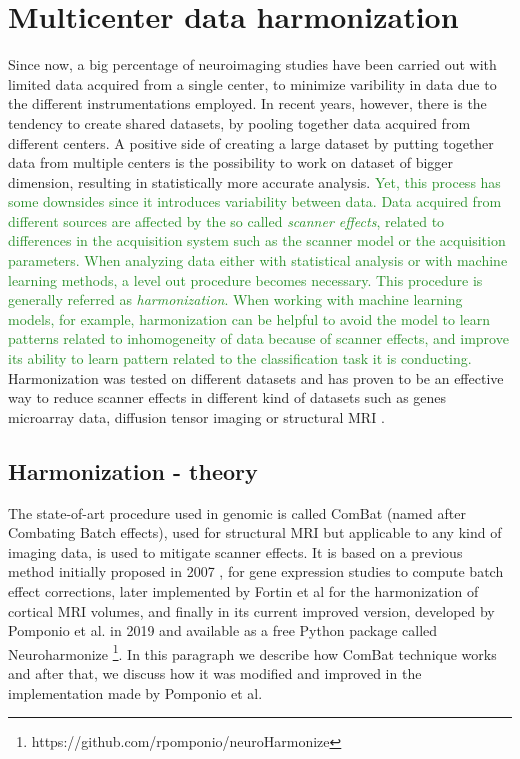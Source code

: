 \documentclass[11pt]{report}
\begin{document}
\newpage


\chapter{Multicenter data harmonization}\label{chap:harmonization_theory}
Since now, a big percentage of neuroimaging studies have been carried out with limited data acquired from a single center, to minimize varibility in data due to the different instrumentations employed.
In recent years, however, there is the tendency to create shared datasets, by pooling together data acquired from different centers.
A positive side of creating a large dataset by putting together data from multiple centers is the possibility to work on dataset of bigger dimension, resulting in statistically more accurate analysis.
\textcolor{ForestGreen}{
Yet, this process has some downsides since it introduces variability between data.
Data acquired from different sources are affected by the so called \emph{scanner effects}, related to differences in the acquisition system such as the scanner model or the acquisition parameters.
When analyzing data either with statistical analysis or with machine learning methods, a level out procedure becomes necessary.
This procedure is generally referred as \emph{harmonization}.
When working with machine learning models, for example, harmonization can be helpful to avoid the model to learn patterns related to inhomogeneity of data because of scanner effects, and improve its ability to learn pattern related to the classification task it is conducting.
}
Harmonization was tested on different datasets and has proven to be an effective way to reduce scanner effects in different kind of datasets such as genes microarray data, diffusion tensor imaging or structural MRI \cite{johnson-2006} \cite{fortin-2017} \cite{lombardi2020}.

\section{Harmonization - theory}\label{sec:harmonizationtheory}


The state-of-art procedure used in genomic is called ComBat (named after Combating Batch effects), used for structural MRI but applicable to any kind of imaging data, is used to mitigate scanner effects.
It is based on a previous method initially proposed in 2007 \cite{johnson-2006}, for gene expression studies to compute batch effect corrections, later implemented by Fortin et al \cite{fortin-2018} for the harmonization of cortical MRI volumes, and finally in its current improved version, developed by Pomponio et al. \cite{pomponio-2019} in 2019 and available as a free Python package called Neuroharmonize \footnote{https://github.com/rpomponio/neuroHarmonize}.
In this paragraph we describe how ComBat technique works and after that, we discuss how it was modified and improved in the implementation made by Pomponio et al.
\end{document}
